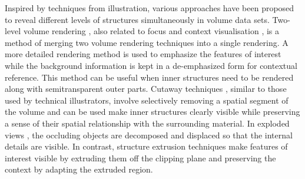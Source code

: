 
Inspired by techniques from illustration, various approaches have been proposed to reveal different levels of structures simultaneously in volume data sets.
Two-level volume rendering \cite{hauser_two-level_2001} \cite{hadwiger_high-quality_2003} \cite{corcoran_perceptual_2010}, also related to focus and context visualisation \cite{wang_magic_2005} \cite{bruckner_illustrative_2006} \cite{chen_intelligent_2008}, is a method of merging two volume rendering techniques into a single rendering. A more detailed rendering method is used to emphasize the features of interest while the background information is kept in a de-emphasized form for contextual reference. This method can be useful when inner structures need to be rendered along with semitransparent outer parts.
Cutaway techniques \cite{burns_feature_2007} \cite{sigg_intelligent_2012}, similar to those used by technical illustrators, involve selectively removing a spatial segment of the volume and can be used make inner structures clearly visible while preserving a sense of their spatial relationship with the surrounding material.
In exploded views \cite{bruckner_exploded_2006}, the occluding objects are decomposed and displaced so that the internal details are visible.
In contrast, structure extrusion techniques \cite{diaz_adaptive_2012} make features of interest visible by extruding them off the clipping plane and preserving the context by adapting the extruded region.

